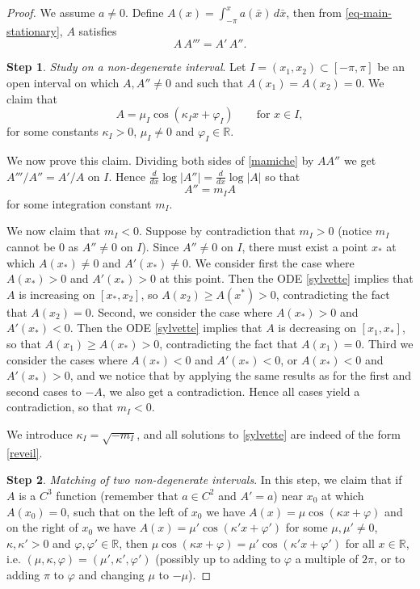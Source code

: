 \documentclass[12pt]{amsart}
\numberwithin{equation}{section}
\numberwithin{equation}{section}
\begin{document}
\begin{proof}
We assume $a\neq 0$. Define $A(x)=\int_{-\pi}^x a(\bar x)\,d\bar x$,  then from \eqref{eq-main-stationary}, $A$ satisfies
\begin{equation} \label{mamiche}
A\, A'''= A'\,A'' .
\end{equation}

\noindent \textbf{Step 1}. \emph{Study on a non-degenerate interval}. Let $I=(x_1,x_2)\subset [-\pi,\pi]$ be an open interval on which $A,A''\neq 0$ and such that $A(x_1)=A(x_2)=0$. We claim that
\begin{equation} \label{reveil}
A= \mu_I \cos(\kappa_I x+ \varphi_I) \qquad \mbox{for }x\in I,
\end{equation}
for some constants $\kappa_I>0$, $\mu_I\neq 0$ and $\varphi_I\in \mathbb R$.

We now prove this claim. Dividing both sides of \eqref{mamiche} by $AA''$ we get $A'''/A''=A'/A$ on $I$. Hence $\frac{d}{dx} \log |A''|=\frac{d}{dx}\log |A|$ so that
\begin{equation} \label{sylvette}
A''=m_I A
\end{equation}
for some integration constant $m_I$.

We now claim that $m_I<0$. Suppose by contradiction that $m_I>0$ (notice $m_I$ cannot be $0$ as $A''\neq 0$ on $I$). Since $A''\neq 0$ on $I$, there must exist a point $x_*$ at which $A(x_*)\neq 0$ and $A'(x_*)\neq 0$. We consider first the case where $A(x_*)>0$ and $A'(x_*)>0$ at this point. Then the ODE \eqref{sylvette} implies that $A$ is increasing on $[x_*,x_2]$, so $A(x_2)\geq A(x^*)>0$, contradicting the fact that $A(x_2)=0$.  Second, we consider the case where $A(x_*)>0$ and $A'(x_*)<0$. Then the ODE \eqref{sylvette} implies that $A$ is decreasing on $[x_1,x_*]$, so that $A(x_1)\geq A(x_*)>0$, contradicting the fact that $A(x_1)=0$. Third we consider the cases where $A(x_*)<0$ and $A'(x_*)<0$, or  $A(x_*)<0$ and $A'(x_*)>0$, and we notice that by applying the same results as for the first and second cases to $-A$, we also get a contradiction. Hence all cases yield a contradiction, so that $m_I<0$.

We introduce $\kappa_I=\sqrt{-m_I}$, and all solutions to \eqref{sylvette} are indeed of the form \eqref{reveil}.

\medskip

\noindent \textbf{Step 2}. \emph{Matching of two non-degenerate intervals}. In this step, we claim that if $A$ is a $C^3$ function  {(remember that $a\in C^2$ and $A'=a$)} near $x_0$ at which $A(x_0)=0$, such that on the left of $x_0$ we have $A(x)= \mu \cos(\kappa x+\varphi)$ and on the right of $x_0$ we have $A(x)= \mu' \cos(\kappa' x+\varphi')$ for some $\mu,\mu'\neq 0$, $\kappa,\kappa'>0$ and $\varphi,\varphi'\in \mathbb R$, then $ \mu \cos(\kappa x+\varphi)= \mu' \cos(\kappa' x+\varphi')$ for all $x\in \mathbb R$, i.e. $(\mu,\kappa,\varphi)=(\mu',\kappa',\varphi')$ (possibly up to adding to $\varphi$ a multiple of $2\pi$, or to adding $\pi$ to $\varphi$ and changing $\mu$ to $-\mu$).


\end{proof}
\end{document}
